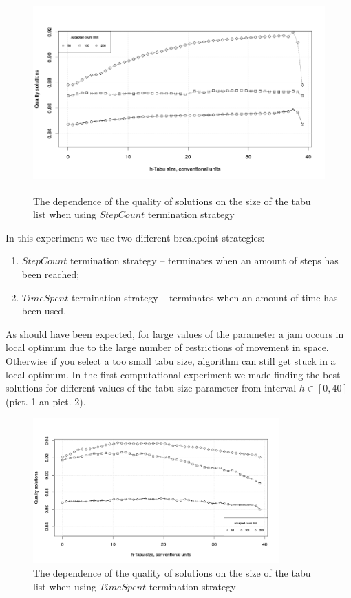\documentclass[]{TAACpaper}
\begin{document}
\begin{figure}[h]
	\hfil\includegraphics[height=3.0in]{images/tabuSize_stepCount}\hfil
	\caption
	{
	  The dependence of the quality of solutions on the size of the tabu list when using $ StepCount $ termination strategy
	}
	\label{aba:fig2}
\end{figure}

In this experiment we use two different breakpoint strategies: 
\begin{enumerate}
	\item $StepCount$ termination strategy --  terminates when an amount of steps has been reached;
	\item $TimeSpent$ termination strategy -- terminates when an amount of time has been used.
\end{enumerate}

As should have been expected, for large values of the parameter a jam occurs in local optimum due to the large number of restrictions of movement in space. Otherwise if you select a too small tabu size, algorithm can still get stuck in a local optimum. In the first computational experiment we made finding the best solutions for different values of the tabu size parameter from interval $h \in [0, 40]$ (pict. 1 an pict. 2).
\begin{figure}[h]
	\hfil\includegraphics[height=2.2in]{images/tabuSize_time}\hfil
	\caption
	{
	  The dependence of the quality of solutions on the size of the tabu list when using $ TimeSpent $ termination strategy
	}
	\label{aba:fig3}
\end{figure}
\end{document}
